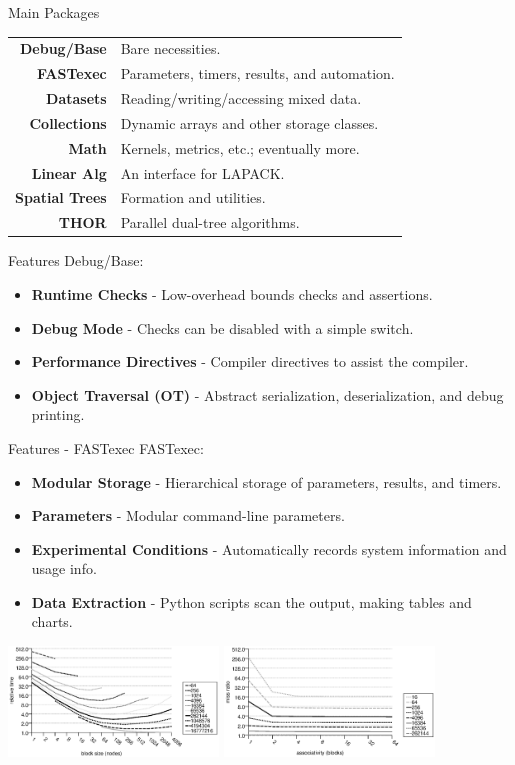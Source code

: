 \documentclass[pdf,colorBG,slideColor]{prosper}
\newcommand{\itemt}[1]{\item {\bf #1} -}
\begin{document}
\begin{slide}{Main Packages}
 \begin{tabular}{rl}
   {\bf Debug/Base}    & Bare necessities. \\
   {\bf FASTexec}      & Parameters, timers, results, and automation. \\
   {\bf Datasets}      & Reading/writing/accessing mixed data. \\
   {\bf Collections}   & Dynamic arrays and other storage classes. \\
   {\bf Math}          & Kernels, metrics, etc.; eventually more. \\
   {\bf Linear Alg}    & An interface for LAPACK. \\
   {\bf Spatial Trees} & Formation and utilities. \\
   {\bf THOR}          & Parallel dual-tree algorithms.
 \end{tabular}
\end{slide}

\begin{slide}{Features}
 Debug/Base:
 \begin{itemize}
 \itemt{Runtime Checks} Low-overhead bounds checks and assertions.
 \itemt{Debug Mode} Checks can be disabled with a simple switch.
 \itemt{Performance Directives} Compiler directives to assist the compiler.
 \itemt{Object Traversal (OT)} Abstract serialization, deserialization, and debug printing.
 \end{itemize}
\end{slide}

\begin{slide}{Features - FASTexec}
 FASTexec:
 \begin{itemize}
 \itemt{Modular Storage} Hierarchical storage of parameters, results, and timers.
 \itemt{Parameters} Modular command-line parameters.
 \itemt{Experimental Conditions}
   Automatically records system information and usage info.
 \itemt{Data Extraction} Python scripts scan the output, making tables and charts.
 \end{itemize}
 \vspace{-.2in}
  \includegraphics[width=2.2in]{g_blocksizes_t.ps}
  \includegraphics[width=2.2in]{g_assoc.ps}
\end{slide}
\end{document}
